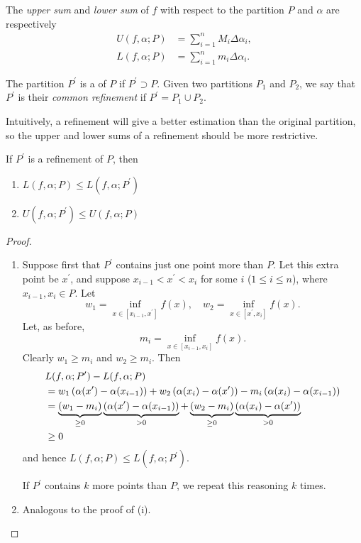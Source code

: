 The \emph{upper sum} and \emph{lower sum} of $f$ with respect to the partition $P$ and $\alpha$ are respectively
\begin{align*}
U(f,\alpha;P)&=\sum_{i=1}^n M_i \Delta \alpha_i,\\
L(f,\alpha;P)&=\sum_{i=1}^n m_i \Delta \alpha_i.
\end{align*}


The partition $P^\prime$ is a  of $P$ if $P^\prime\supset P$. Given two partitions $P_1$ and $P_2$, we say that $P^\prime$ is their \emph{common refinement} if $P^\prime=P_1\cup P_2$.

Intuitively, a refinement will give a better estimation than the original partition, so the upper and lower sums of a refinement should be more restrictive.

\begin{lemma}\label{lemma:int-refinement}
If $P^\prime$ is a refinement of $P$, then
\begin{enumerate}[label=(\roman*)]
\item $L(f,\alpha;P)\le L(f,\alpha;P^\prime)$
\item $U(f,\alpha;P^\prime)\le U(f,\alpha;P)$
\end{enumerate}
\end{lemma}

\begin{proof} \
\begin{enumerate}[label=(\roman*)]
\item Suppose first that $P^\prime$ contains just one point more than $P$. Let this extra point be $x^\prime$, and suppose $x_{i-1}<x^\prime<x_i$ for some $i$ ($1\le i\le n$), where $x_{i-1},x_i\in P$. Let
\[w_1=\inf_{x\in[x_{i-1},x^\prime]}f(x),\quad w_2=\inf_{x\in[x^\prime,x_i]}f(x).\]
Let, as before,
\[m_i=\inf_{x\in[x_{i-1},x_i]}f(x).\]
Clearly $w_1\ge m_i$ and $w_2\ge m_i$. Then
\begin{align*}
&L(f,\alpha;P^\prime)-L(f,\alpha;P)\\
&=w_1\left(\alpha(x^\prime)-\alpha(x_{i-1})\right)+w_2\left(\alpha(x_i)-\alpha(x^\prime)\right)-m_i\left(\alpha(x_i)-\alpha(x_{i-1})\right)\\
&=\underbrace{(w_1-m_i)}_{\ge0}\underbrace{\left(\alpha(x^\prime)-\alpha(x_{i-1})\right)}_{>0}+\underbrace{(w_2-m_i)}_{\ge0}\underbrace{\left(\alpha(x_i)-\alpha(x^\prime)\right)}_{>0}\\
&\ge0
\end{align*}
and hence $L(f,\alpha;P)\le L(f,\alpha;P^\prime)$.

If $P^\prime$ contains $k$ more points than $P$, we repeat this reasoning $k$ times.

\item Analogous to the proof of (i).
\end{enumerate}
\end{proof}

